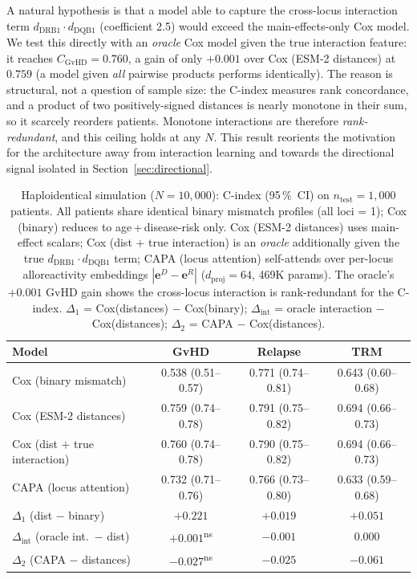 \documentclass[11pt,a4paper]{article}
\begin{document}
A natural hypothesis is that a model able to capture the cross-locus
interaction term $d_{\mathrm{DRB1}}\!\cdot\!d_{\mathrm{DQB1}}$ (coefficient 2.5)
would exceed the main-effects-only Cox model.  We test this directly with an
\emph{oracle} Cox model given the true interaction feature: it reaches
$C_{\mathrm{GvHD}} = 0.760$, a gain of only $+0.001$ over Cox (ESM-2 distances)
at $0.759$ (a model given \emph{all} pairwise products performs identically).
The reason is structural, not a question of sample size: the C-index measures
rank concordance, and a product of two positively-signed distances is nearly
monotone in their sum, so it scarcely reorders patients.  Monotone interactions
are therefore \emph{rank-redundant}, and this ceiling holds at any $N$.  This
result reorients the motivation for the architecture away from interaction
learning and towards the directional signal isolated in
Section~\ref{sec:directional}.

\begin{table}[ht]
\centering
\caption{Haploidentical simulation ($N=10{,}000$): C-index (95\,\%~CI) on
$n_{\mathrm{test}}=1{,}000$ patients.  All patients share identical binary mismatch
profiles (all loci = 1); Cox (binary) reduces to age\,+\,disease-risk only.
Cox (ESM-2 distances) uses main-effect scalars; Cox (dist $+$ true interaction)
is an \emph{oracle} additionally given the true $d_{\mathrm{DRB1}}\!\cdot\!d_{\mathrm{DQB1}}$
term; CAPA (locus attention) self-attends
over per-locus alloreactivity embeddings $|\mathbf{e}^D - \mathbf{e}^R|$ ($d_{\mathrm{proj}}=64$,
469K params).  The oracle's $+0.001$ GvHD gain shows the cross-locus interaction
is rank-redundant for the C-index.
$\Delta_1$ = Cox(distances) $-$ Cox(binary);
$\Delta_{\mathrm{int}}$ = oracle interaction $-$ Cox(distances);
$\Delta_2$ = CAPA $-$ Cox(distances).}
\label{tab:haplo}
\smallskip
\begin{tabular}{lccc}
\toprule
Model & GvHD & Relapse & TRM \\
\midrule
Cox (binary mismatch)              & 0.538 (0.51--0.57) & 0.771 (0.74--0.81) & 0.643 (0.60--0.68) \\
Cox (ESM-2 distances)              & 0.759 (0.74--0.78) & 0.791 (0.75--0.82) & 0.694 (0.66--0.73) \\
Cox (dist $+$ true interaction)    & 0.760 (0.74--0.78) & 0.790 (0.75--0.82) & 0.694 (0.66--0.73) \\
CAPA (locus attention)             & 0.732 (0.71--0.76) & 0.766 (0.73--0.80) & 0.633 (0.59--0.68) \\
\midrule
$\Delta_1$ (dist $-$ binary)     & $\mathbf{+0.221}$ & $+0.019$ & $+0.051$ \\
$\Delta_{\mathrm{int}}$ (oracle int.\ $-$ dist) & $+0.001$\textsuperscript{ns} & $-0.001$ & $0.000$ \\
$\Delta_2$ (CAPA $-$ distances)  & $-0.027$\textsuperscript{ns} & $-0.025$ & $-0.061$ \\
\bottomrule
\end{tabular}
\smallskip\\
\end{table}
\end{document}
